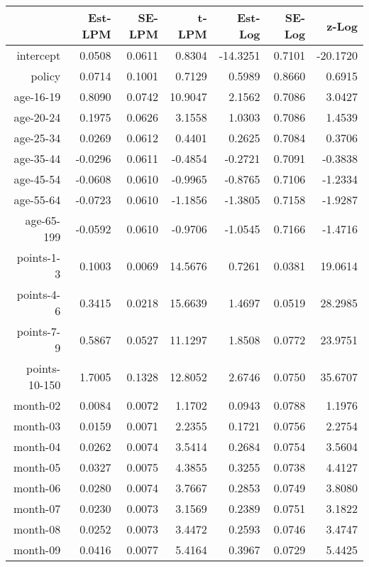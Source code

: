 \documentclass[10pt]{article}
\begin{document}
\begin{table}[ht]
\centering
\begin{tabular}{rrrrrrr}
  \hline
 & Est-LPM & SE-LPM & t-LPM & Est-Log & SE-Log & z-Log \\ 
  \hline
intercept & 0.0508 & 0.0611 & 0.8304 & -14.3251 & 0.7101 & -20.1720 \\ 
  policy & 0.0714 & 0.1001 & 0.7129 & 0.5989 & 0.8660 & 0.6915 \\ 
  age-16-19 & 0.8090 & 0.0742 & 10.9047 & 2.1562 & 0.7086 & 3.0427 \\ 
  age-20-24 & 0.1975 & 0.0626 & 3.1558 & 1.0303 & 0.7086 & 1.4539 \\ 
  age-25-34 & 0.0269 & 0.0612 & 0.4401 & 0.2625 & 0.7084 & 0.3706 \\ 
  age-35-44 & -0.0296 & 0.0611 & -0.4854 & -0.2721 & 0.7091 & -0.3838 \\ 
  age-45-54 & -0.0608 & 0.0610 & -0.9965 & -0.8765 & 0.7106 & -1.2334 \\ 
  age-55-64 & -0.0723 & 0.0610 & -1.1856 & -1.3805 & 0.7158 & -1.9287 \\ 
  age-65-199 & -0.0592 & 0.0610 & -0.9706 & -1.0545 & 0.7166 & -1.4716 \\ 
  points-1-3 & 0.1003 & 0.0069 & 14.5676 & 0.7261 & 0.0381 & 19.0614 \\ 
  points-4-6 & 0.3415 & 0.0218 & 15.6639 & 1.4697 & 0.0519 & 28.2985 \\ 
  points-7-9 & 0.5867 & 0.0527 & 11.1297 & 1.8508 & 0.0772 & 23.9751 \\ 
  points-10-150 & 1.7005 & 0.1328 & 12.8052 & 2.6746 & 0.0750 & 35.6707 \\ 
  month-02 & 0.0084 & 0.0072 & 1.1702 & 0.0943 & 0.0788 & 1.1976 \\ 
  month-03 & 0.0159 & 0.0071 & 2.2355 & 0.1721 & 0.0756 & 2.2754 \\ 
  month-04 & 0.0262 & 0.0074 & 3.5414 & 0.2684 & 0.0754 & 3.5604 \\ 
  month-05 & 0.0327 & 0.0075 & 4.3855 & 0.3255 & 0.0738 & 4.4127 \\ 
  month-06 & 0.0280 & 0.0074 & 3.7667 & 0.2853 & 0.0749 & 3.8080 \\ 
  month-07 & 0.0230 & 0.0073 & 3.1569 & 0.2389 & 0.0751 & 3.1822 \\ 
  month-08 & 0.0252 & 0.0073 & 3.4472 & 0.2593 & 0.0746 & 3.4747 \\ 
  month-09 & 0.0416 & 0.0077 & 5.4164 & 0.3967 & 0.0729 & 5.4425 \\ 

\end{tabular}
\end{table}
\end{document}
